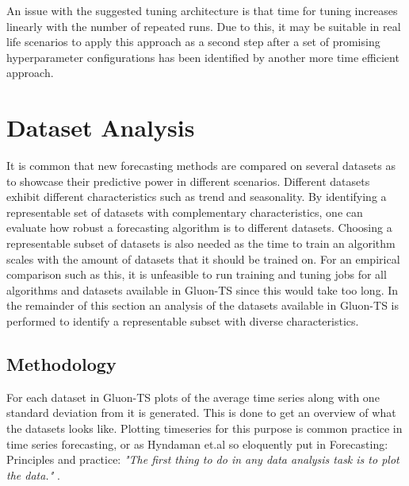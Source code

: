 An issue with the suggested tuning architecture is that time for tuning increases linearly with the number of repeated runs. Due to this, it may be suitable in real life scenarios to apply this approach as a second step after a set of promising hyperparameter configurations has been identified by another more time efficient approach.

\section{Dataset Analysis}
\label{sec:dataset_analysis}
It is common that new forecasting methods are compared on several datasets as to showcase their predictive power in different scenarios. Different datasets exhibit different characteristics such as trend and seasonality. By identifying a representable set of datasets with complementary characteristics, one can evaluate how robust a forecasting algorithm is to different datasets. Choosing a representable subset of datasets is also needed as the time to train an algorithm scales with the amount of datasets that it should be trained on. For an empirical comparison such as this, it is unfeasible to run training and tuning jobs for all algorithms and datasets available in Gluon-TS since this would take too long. In the remainder of this section an analysis of the datasets available in Gluon-TS is performed to identify a representable subset with diverse characteristics.

\subsection{Methodology}

For each dataset in Gluon-TS plots of the average time series along with one standard deviation from it is generated. This is done to get an overview of what the datasets looks like. Plotting timeseries for this purpose is common practice in time series forecasting, or as Hyndaman et.al so eloquently put in Forecasting: Principles and practice: \textit{"The first thing to do in any data analysis task is to plot the data."} \cite{hyndman_forecasting_3rd}.

